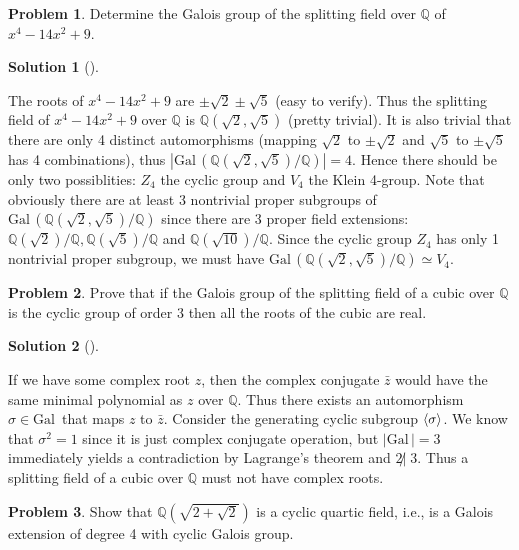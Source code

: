 \documentclass{article}
\theoremstyle{definition}
\newtheorem{prob}{Problem}
\newtheorem*{sol}{Solution}
\newenvironment{sols}[1][]{%
  \begin{sol}[#1]$ $\par\nobreak\ignorespaces
}{%
  \end{sol}
}
\newcommand{\QQ}{\mathbb Q}
\newcommand{\Gal}{\text{Gal}\,}
\begin{document}
\setcounter{prob}{11}
\begin{prob}
	Determine the Galois group of the splitting field over $\QQ$ of $x^4 - 14 x^2 + 9$.
\end{prob}

\begin{sols}
	The roots of $x^4 - 14 x^2 + 9$ are $\pm \sqrt{2} \pm \sqrt{5}$ (easy to verify).
	Thus the splitting field of $x^4 - 14 x^2 + 9$ over $\QQ$ is $\QQ(\sqrt{2}, \sqrt{5})$ (pretty trivial).
	It is also trivial that there are only 4 distinct automorphisms (mapping $\sqrt{2}$ to $\pm \sqrt{2}$ and $\sqrt{5}$ to $\pm \sqrt{5}$ has 4 combinations), thus $|\Gal(\QQ(\sqrt{2}, \sqrt{5})/\QQ)| = 4$.
	Hence there should be only two possiblities: $Z_4$ the cyclic group and $V_4$ the Klein 4-group. 
	Note that obviously there are at least 3 nontrivial proper subgroups of $\Gal(\QQ(\sqrt{2}, \sqrt{5})/\QQ)$ since there are 3 proper field extensions: $\QQ(\sqrt{2})/\QQ, \QQ(\sqrt{5})/\QQ$ and $\QQ(\sqrt{10})/\QQ$.
	Since the cyclic group $Z_4$ has only 1 nontrivial proper subgroup, we must have $\Gal(\QQ(\sqrt{2}, \sqrt{5})/\QQ) \simeq V_4$.
\end{sols}

\begin{prob}
	Prove that if the Galois group of the splitting field of a cubic over $\QQ$ is the cyclic group of order 3 then all the roots of the cubic are real.
\end{prob}

\begin{sols}
	If we have some complex root $z$, then the complex conjugate $\bar{z}$ would have the same minimal polynomial as $z$ over $\QQ$.
	Thus there exists an automorphism $\sigma \in \Gal$ that maps $z$ to $\bar{z}$.
	Consider the generating cyclic subgroup $\ev{\sigma}$. 
	We know that $\sigma^2 = 1$ since it is just complex conjugate operation, but $|\Gal| = 3$ immediately yields a contradiction by Lagrange's theorem and $2 \not| \;3$.
	Thus a splitting field of a cubic over $\QQ$ must not have complex roots.
\end{sols}

\begin{prob}
	Show that $\QQ(\sqrt{2 + \sqrt{2}})$ is a cyclic quartic field, i.e., is a Galois extension of degree 4 with cyclic Galois group.
\end{prob}
\end{document}
